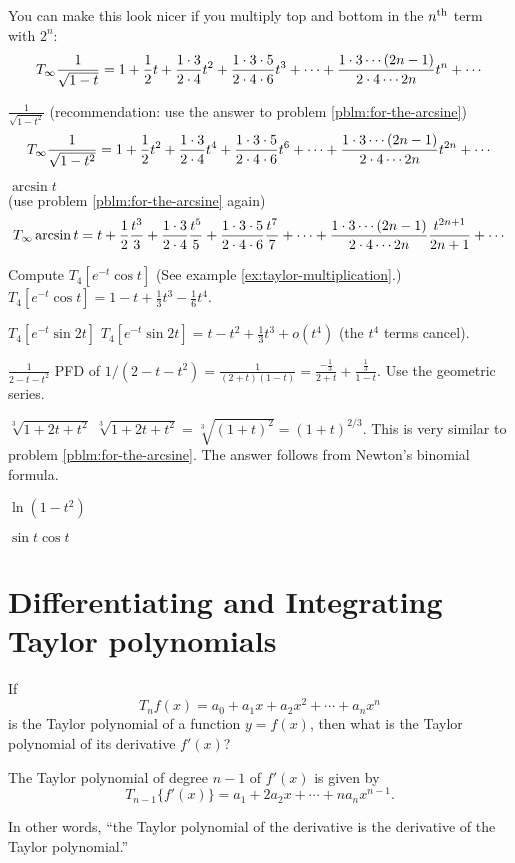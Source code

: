 \begin{multicols}{2}
You can make this look nicer if you multiply top and bottom in the
$n^{\rm th}$ term with $2^n$:
\[
T_{\infty}\frac1{\sqrt{1-t}} = 1 + \frac12 t + \frac{1\cdot3}{2\cdot 4}t^2
+\frac{1\cdot3\cdot5}{2\cdot4\cdot6}t^3+\cdots
+\frac{1\cdot3\cdots(2n-1)}{2\cdot4\cdots2n}t^n+\cdots
\]
\endanswer

\problem \(\displaystyle\frac1{\sqrt{1-t^2}}\) (recommendation: use the %
answer to problem \ref{pblm:for-the-arcsine})
\answer %
\[
T_{\infty}\frac1{\sqrt{1-t^2}} = 1 + \frac12 t^2 + \frac{1\cdot3}{2\cdot 4}t^4
+\frac{1\cdot3\cdot5}{2\cdot4\cdot6}t^6+\cdots
+\frac{1\cdot3\cdots(2n-1)}{2\cdot4\cdots2n}t^{2n}+\cdots
\]
\endanswer

\problem \(\displaystyle \arcsin t\)\\ %
(use problem \ref{pblm:for-the-arcsine} again)
\answer %
\[
T_{\infty}\arcsin t = t + \frac12 \frac{t^3}{3} + \frac{1\cdot3}{2\cdot 4}
\frac{t^5}{5} +\frac{1\cdot3\cdot5}{2\cdot4\cdot6}\frac{t^7}{7}+\cdots
+\frac{1\cdot3\cdots(2n-1)}{2\cdot4\cdots2n}\frac{t^{2n+1}}{2n+1}+\cdots
\]
\endanswer

\problem Compute \(\displaystyle T_4 [e^{-t}\cos t]\) (See example %
\ref{ex:taylor-multiplication}.)
\answer %
$T_4 [e^{-t}\cos t] = 1-t+\frac13 t^3 - \frac16 t^4$.
\endanswer

\problem \(\displaystyle T_4 [e^{-t}\sin 2t]\) %
\answer %
\(\displaystyle T_4 [e^{-t}\sin 2t] = t-t^2+\frac13t^3+o(t^4)\) (the
$t^4$ terms cancel).
\endanswer

\problem \(\displaystyle \frac1{2-t-t^2} \) %
\answer %
PFD of $1/(2-t-t^2) = \frac1{(2+t)(1-t)} = \frac{-\frac13}{2+t} +
\frac{\frac13}{1-t}$.  Use the geometric series.
\endanswer

\problem \(\displaystyle \sqrt[3]{1+2t+t^2} \) %
\answer %
$\sqrt[3]{1+2t+t^2} = \sqrt[3]{(1+t)^2} = (1+t)^{2/3}$.  This is very
similar to problem \ref{pblm:for-the-arcsine}.  The answer follows from
Newton's binomial formula.
\endanswer

\problem \(\displaystyle \ln (1-t^2)\) %

\problem \(\displaystyle \sin t\cos t\) %


\end{multicols}
\noproblemfont


\section{Differentiating and Integrating Taylor polynomials} %
\label{sec:diff-tayl-polyn}
If
\[
T_nf(x) = a_0+a_1x+a_2x^2+\cdots+a_nx^n
\]
is the Taylor polynomial of a function $y=f(x)$, then what is the Taylor
polynomial of its derivative $f'(x)$?
\begin{theorem}\label{thm:Taylor-differentiated}
  The Taylor polynomial of degree $n-1$ of $f'(x)$ is given by
  \[
  T_{n-1}\{f'(x)\} = a_1+2a_2x+\cdots+na_nx^{n-1}.
  \]
\end{theorem}%
In other words, ``the Taylor polynomial of the derivative is the derivative
of the Taylor polynomial.''

